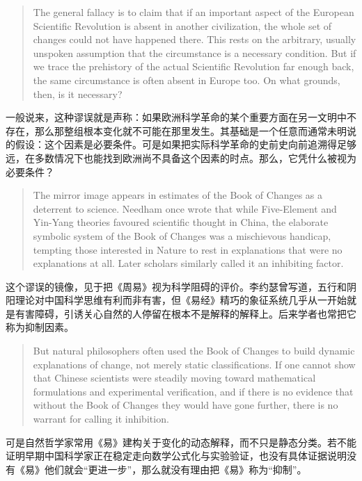 \documentclass[UTF8,zihao=-4]{ctexart}
\newenvironment{enblock}
  {\par\smallskip\noindent{\scriptsize\bfseries English}\par\begin{quote}\small}
  {\end{quote}}
\newenvironment{zhblock}
  {\par\noindent{\scriptsize\bfseries 中文}\par}
  {\par\medskip}
\begin{document}
\begin{enblock}
The general fallacy is to claim that if an important aspect of the European Scientific Revolution is absent in another civilization, the whole set of changes could not have happened there. This rests on the arbitrary, usually unspoken assumption that the circumstance is a necessary condition. But if we trace the prehistory of the actual Scientific Revolution far enough back, the same circumstance is often absent in Europe too. On what grounds, then, is it necessary?
\end{enblock}
\begin{zhblock}
一般说来，这种谬误就是声称：如果欧洲科学革命的某个重要方面在另一文明中不存在，那么那整组根本变化就不可能在那里发生。其基础是一个任意而通常未明说的假设：这个因素是必要条件。可是如果把实际科学革命的史前史向前追溯得足够远，在多数情况下也能找到欧洲尚不具备这个因素的时点。那么，它凭什么被视为必要条件？
\end{zhblock}

\begin{enblock}
The mirror image appears in estimates of the Book of Changes as a deterrent to science. Needham once wrote that while Five-Element and Yin-Yang theories favoured scientific thought in China, the elaborate symbolic system of the Book of Changes was a mischievous handicap, tempting those interested in Nature to rest in explanations that were no explanations at all. Later scholars similarly called it an inhibiting factor.
\end{enblock}
\begin{zhblock}
这个谬误的镜像，见于把《周易》视为科学阻碍的评价。李约瑟曾写道，五行和阴阳理论对中国科学思维有利而非有害，但《易经》精巧的象征系统几乎从一开始就是有害障碍，引诱关心自然的人停留在根本不是解释的解释上。后来学者也常把它称为抑制因素。
\end{zhblock}

\begin{enblock}
But natural philosophers often used the Book of Changes to build dynamic explanations of change, not merely static classifications. If one cannot show that Chinese scientists were steadily moving toward mathematical formulations and experimental verification, and if there is no evidence that without the Book of Changes they would have gone further, there is no warrant for calling it inhibition.
\end{enblock}
\begin{zhblock}
可是自然哲学家常用《易》建构关于变化的动态解释，而不只是静态分类。若不能证明早期中国科学家正在稳定走向数学公式化与实验验证，也没有具体证据说明没有《易》他们就会“更进一步”，那么就没有理由把《易》称为“抑制”。
\end{zhblock}
\end{document}
